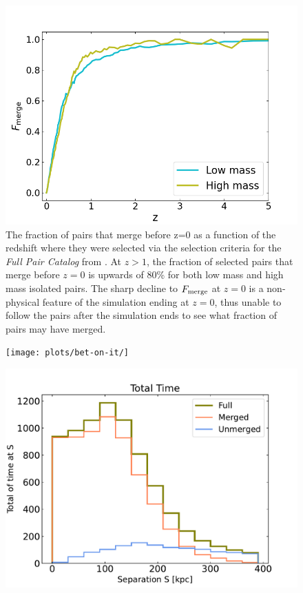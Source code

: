 \documentclass[twocolumn]{aastex631}
\newcommand{\paircat}{\textit{Full Pair Catalog}}
\begin{document}
\begin{figure}[htb]
    \centering
    \includegraphics[width=\columnwidth]{plots/bet-on-it/1_fmerge_comp.png}
    \caption{The fraction of pairs that merge before z=0 as a function of the redshift where they were selected via the selection criteria for the \paircat{} from \citet{Chamberlain2024}. At $z>1$, the fraction of selected pairs that merge before $z=0$ is upwards of 80\% for both low mass and high mass isolated pairs. The sharp decline to $F_{\rm merge}$ at $z=0$ is a non-physical feature of the simulation ending at $z=0$, thus unable to follow the pairs after the simulation ends to see what fraction of pairs may have merged.}
    \label{fig:fmerge}
\end{figure}

\begin{figure}[htb]
    \centering
    \texttt{[image: plots/bet-on-it/]}
    \caption{}
\end{figure}


\begin{figure}[htb]
    \centering
    \includegraphics[width=\columnwidth]{plots/3_timescale-analysis/fullsamples.pdf}
    \caption{}
\end{figure}
\end{document}
